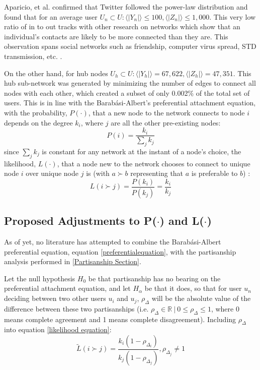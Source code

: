 \documentclass[preprint,review,12pt]{elsarticle}
\begin{document}
Aparicio, et al. confirmed that Twitter followed the power-law distribution and found that for an average user $U_n \subset U:\langle | Y_n| \rangle \leq 100, \langle | Z_n| \rangle \leq 1,000$. This very low ratio of in to out tracks with other research on networks which show that an individual's contacts are likely to be more connected than they are. This observation spans social networks such as friendship, computer virus spread, STD transmission, etc. \cite{feld1991your,newman2003ego,pastor2001epidemic,pastor2002epidemic,pastor2015epidemic,helleringer2007sexual,hethcote2014gonorrhea,liljeros2001web}.

On the other hand, for hub nodes $U_h \subset U: \langle | Y_h| \rangle = 67,622, \langle | Z_h| \rangle = 47,351$. This hub sub-network was generated by minimizing the number of edges to connect all nodes with each other, which created a subset of only 0.002\% of the total set of users. This is in line with the Barab{\'a}si-Albert's preferential attachment equation, with the probability, $P(\cdot)$, that a new node to the network connects to node $i$ depends on the degree $k_i$, where $j$ are all the other pre-existing nodes:
\begin{equation}
\label{preferentialequation}
    P(i)=\frac{k_i}{\sum_{j} k_j}
\end{equation}
since $\sum_{j} k_j$ is constant for any network at the instant of a node's choice, the likelihood, $L(\cdot)$, that a node new to the network chooses to connect to unique node $i$ over unique node $j$ is (with $a \succ b$ representing that $a$ is preferable to $b$) :
\begin{equation}
\label{likelihood equation}
    L(i \succ j)=\frac{P(k_i)}{P(k_j)} = \frac{k_i}{k_j}
\end{equation}

\subsection{Proposed Adjustments to P($\cdot$) and L($\cdot$)}
As of yet, no literature has attempted to combine the Barab{\'a}si-Albert preferential equation, equation \ref{preferentialequation}, with the partisanship analysis performed in \ref{Partisanship Section}.

Let the null hypothesis $H_0$ be that partisanship has no bearing on the preferential attachment equation, and let $H_\alpha$ be that it does, so that for user $u_n$ deciding between two other users $u_i$ and $u_j$, $\rho_{\Delta}$ will be the absolute value of the difference between these two partisanships (i.e. $\rho_{\Delta} \in \mathbb{R} \ |\  0 \leq \rho_{\Delta} \leq 1$, where 0 means complete agreement and 1 means complete disagreement). Including $\rho_\Delta$ into equation
\ref{likelihood equation}:
\begin{equation}
\label{Ldotpartisan}
        \tilde{L}(i \succ j)=\frac{k_i(1-\rho_{\Delta_i})}{k_j(1-\rho_{\Delta_j})},\rho_{\Delta_j}\neq 1 
\end{equation}
\end{document}
